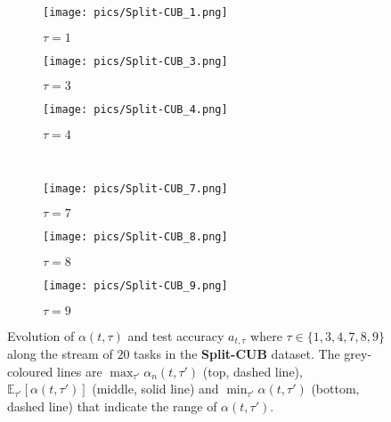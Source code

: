 \documentclass{article} \usepackage{collas2022_conference,times}
\begin{document}
    \begin{figure*}[t!]
        \centering
        \begin{subfigure}[b]{0.32\textwidth}
            \texttt{[image: pics/Split-CUB\_1.png]}\caption{$\tau=1$}
        \end{subfigure}
        \hfill
        \begin{subfigure}[b]{0.32\textwidth}
            \texttt{[image: pics/Split-CUB\_3.png]}\caption{$\tau=3$}
        \end{subfigure}
        \hfill
        \begin{subfigure}[b]{0.32\textwidth}
            \texttt{[image: pics/Split-CUB\_4.png]}\caption{$\tau=4$}
        \end{subfigure}
        \\
        \begin{subfigure}[b]{0.32\textwidth}
            \texttt{[image: pics/Split-CUB\_7.png]}\caption{$\tau=7$}
        \end{subfigure}
        \hfill
        \begin{subfigure}[b]{0.32\textwidth}
            \texttt{[image: pics/Split-CUB\_8.png]}\caption{$\tau=8$}
        \end{subfigure}
        \hfill
        \begin{subfigure}[b]{0.32\textwidth}
            \texttt{[image: pics/Split-CUB\_9.png]}\caption{$\tau=9$}
        \end{subfigure}
        \caption{Evolution of $\alpha(t,\tau)$ and test accuracy $a_{t,\tau}$ where $\tau \in \{1,3,4,7,8,9\}$ along the stream of $20$ tasks in the \textbf{Split-CUB} dataset. The grey-coloured lines are $\max_{\tau'} \alpha_n(t,\tau')$  (top, dashed line), $\mathbb{E}_{\tau'} [\alpha(t,\tau')]$  (middle, solid line) and $\min_{\tau'} \alpha(t,\tau')$  (bottom, dashed line) that indicate the range of $\alpha(t,\tau')$.}
        \label{alpha_cub_app}
    \end{figure*}
\end{document}
